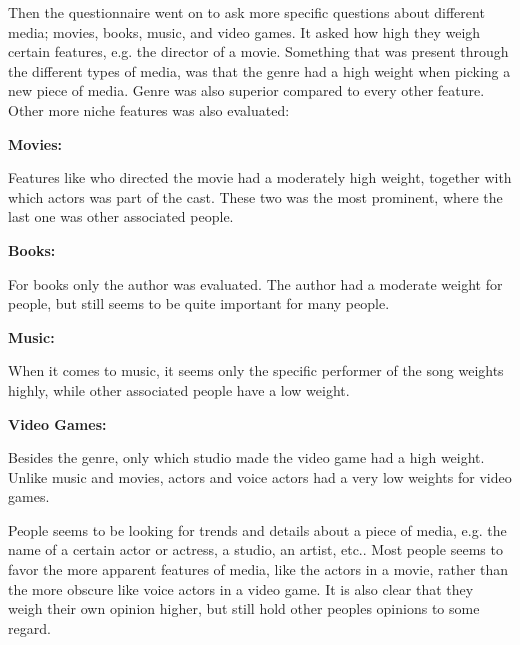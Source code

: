 Then the questionnaire went on to ask more specific questions about different media; movies, books, music, and video games. It asked how high they weigh certain features, e.g. the director of a movie. Something that was present through the different types of media, was that the genre had a high weight when picking a new piece of media. Genre was also superior compared to every other feature.
Other more niche features was also evaluated:

\textbf{Movies:}

Features like who directed the movie had a moderately high weight, together with which actors was part of the cast. These two was the most prominent, where the last one was other associated people.

\textbf{Books:}

For books only the author was evaluated. The author had a moderate weight for people, but still seems to be quite important for many people.

\textbf{Music:}

When it comes to music, it seems only the specific performer of the song weights highly, while other associated people have a low weight.

\textbf{Video Games:}

Besides the genre, only which studio made the video game had a high weight. Unlike music and movies, actors and voice actors had a very low weights for video games.

People seems to be looking for trends and details about a piece of media, e.g. the name of a certain actor or actress, a studio, an artist, etc.. Most people seems to favor the more apparent features of media, like the actors in a movie, rather than the more obscure like voice actors in a video game. It is also clear that they weigh their own opinion higher, but still hold other peoples opinions to some regard.